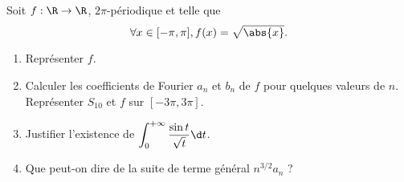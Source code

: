 \begin{enonce}
\begin{exercise}[ID={RMS 122-2 E1096 Centrale PC},subtitle={},tags={}]
Soit $f:\R\to\R$, $2\pi$-périodique et telle que
\begin{equation*}
  \forall x\in[-\pi,\pi], f(x)=\sqrt{\abs{x}}.
\end{equation*}
\begin{enumerate}
  \item Représenter $f$.
  \item Calculer les coefficients de Fourier $a_n$ et $b_n$ de $f$ pour quelques valeurs de $n$. Représenter $S_{10}$ et $f$ sur $[-3\pi,3\pi]$.
  \item Justifier l'existence de $\displaystyle\int_0^{+\infty} \frac{\sin t}{\sqrt t}\d t$.
  \item Que peut-on dire de la suite de terme général $n^{3/2}a_n$ ?
\end{enumerate}
\end{exercise}
\begin{solution}
\end{solution}
\end{enonce}

